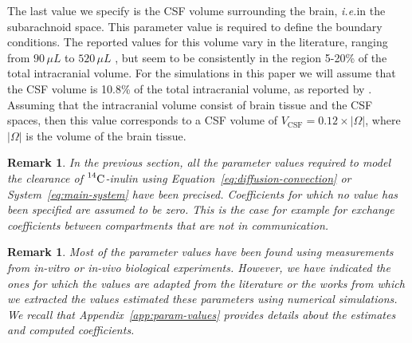 \documentclass[10pt]{article}
\newcommand{\AP}[1]{\textcolor{blue}{AP: #1}}
\newcommand{\ie}{\emph{i.e.}\;}
\newcommand{\1}{^{(1)}}
\newcommand{\2}{^{(2)}}
\newcommand{\Cinulin}{$\prescript{14}{}{\text{C}}$-inulin }
\newtheorem{remark}[theorem]{Remark}
\begin{document}



The last value we specify is the CSF volume surrounding the brain, \ie in the subarachnoid space. This parameter value is required to define the boundary conditions.  
The reported values for this volume vary in the literature, ranging from $90 \, \si{\mu L}$ \cite{pardridge2011drug} to $520 \, \si{\mu L}$ \cite{lai1983sampling}, but seem to be consistently in the region 5-20\% of the total intracranial volume. For the simulations in this paper we will assume that the CSF volume is 10.8\% of the total intracranial volume, as reported by \cite{murtha2014cerebrospinal}. Assuming that the intracranial volume consist of brain tissue and the CSF spaces, then this value corresponds to a CSF volume of $V_\text{CSF} = 0.12\times |\Omega|$, where $|\Omega|$ is the volume of the brain tissue.

\begin{remark}
In the previous section, all the parameter values required to model the clearance of \Cinulin using Equation~\eqref{eq:diffusion-convection} or System~\eqref{eq:main-system} have been precised. Coefficients for which no value has been specified are assumed to be zero. This is the case for example for exchange coefficients between compartments that are not in communication.
\end{remark}

\begin{remark}
Most of the parameter values have been found using measurements from \textit{in-vitro} or \textit{in-vivo} biological experiments. However, we have indicated the ones for which the values are adapted from the literature or the works from which we extracted the values estimated these parameters using numerical simulations. We recall that Appendix~\ref{app:param-values} provides details about the estimates and computed coefficients.
\end{remark}
\end{document}
